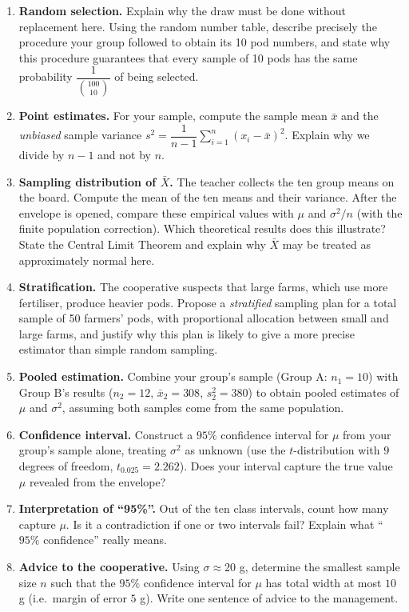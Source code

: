 \documentclass[11pt]{article}
\begin{document}
\begin{enumerate}
\item \textbf{Random selection.} Explain why the draw must be done without replacement here. Using the random number table, describe precisely the procedure your group followed to obtain its 10 pod numbers, and state why this procedure guarantees that every sample of 10 pods has the same probability $\dfrac{1}{\binom{100}{10}}$ of being selected.
\item \textbf{Point estimates.} For your sample, compute the sample mean $\bar{x}$ and the \emph{unbiased} sample variance $s^2 = \dfrac{1}{n-1}\sum_{i=1}^{n}(x_i - \bar{x})^2$. Explain why we divide by $n-1$ and not by $n$.
\item \textbf{Sampling distribution of $\bar{X}$.} The teacher collects the ten group means on the board. Compute the mean of the ten means and their variance. After the envelope is opened, compare these empirical values with $\mu$ and $\sigma^2/n$ (with the finite population correction). Which theoretical results does this illustrate? State the Central Limit Theorem and explain why $\bar{X}$ may be treated as approximately normal here.
\item \textbf{Stratification.} The cooperative suspects that large farms, which use more fertiliser, produce heavier pods. Propose a \emph{stratified} sampling plan for a total sample of 50 farmers' pods, with proportional allocation between small and large farms, and justify why this plan is likely to give a more precise estimator than simple random sampling.
\item \textbf{Pooled estimation.} Combine your group's sample (Group A: $n_1 = 10$) with Group B's results ($n_2 = 12$, $\bar{x}_2 = 308$, $s_2^2 = 380$) to obtain pooled estimates of $\mu$ and $\sigma^2$, assuming both samples come from the same population.
\item \textbf{Confidence interval.} Construct a $95\%$ confidence interval for $\mu$ from your group's sample alone, treating $\sigma^2$ as unknown (use the $t$-distribution with $9$ degrees of freedom, $t_{0.025} = 2.262$). Does your interval capture the true value $\mu$ revealed from the envelope?
\item \textbf{Interpretation of ``95\%''.} Out of the ten class intervals, count how many capture $\mu$. Is it a contradiction if one or two intervals fail? Explain what ``$95\%$ confidence'' really means.
\item \textbf{Advice to the cooperative.} Using $\sigma \approx 20$ g, determine the smallest sample size $n$ such that the $95\%$ confidence interval for $\mu$ has total width at most $10$ g (i.e.\ margin of error $5$ g). Write one sentence of advice to the management.
\end{enumerate}
\end{document}
